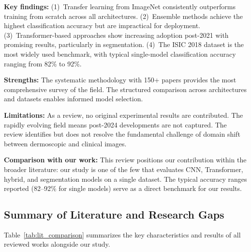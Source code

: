 \documentclass[10pt,twocolumn]{article}
\begin{document}
\textbf{Key findings:} (1)~Transfer learning from ImageNet consistently outperforms training from scratch across all architectures. (2)~Ensemble methods achieve the highest classification accuracy but are impractical for deployment. (3)~Transformer-based approaches show increasing adoption post-2021 with promising results, particularly in segmentation. (4)~The ISIC 2018 dataset is the most widely used benchmark, with typical single-model classification accuracy ranging from 82\% to 92\%.

\textbf{Strengths:} The systematic methodology with 150+ papers provides the most comprehensive survey of the field. The structured comparison across architectures and datasets enables informed model selection.

\textbf{Limitations:} As a review, no original experimental results are contributed. The rapidly evolving field means post-2024 developments are not captured. The review identifies but does not resolve the fundamental challenge of domain shift between dermoscopic and clinical images.

\textbf{Comparison with our work:} This review positions our contribution within the broader literature: our study is one of the few that evaluates CNN, Transformer, hybrid, and segmentation models on a single dataset. The typical accuracy ranges reported (82--92\% for single models) serve as a direct benchmark for our results.

\subsection{Summary of Literature and Research Gaps}

Table~\ref{tab:lit_comparison} summarizes the key characteristics and results of all reviewed works alongside our study.
\end{document}
